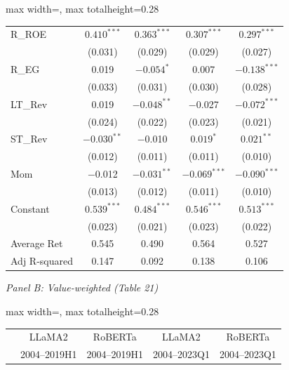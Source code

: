 \begin{table}[htbp]
{\begin{adjustbox}{max width=\linewidth, max totalheight=0.28\textheight}
\begin{tabular}{lcccc}
R\_ROE & $0.410^{***}$ & $0.363^{***}$ & $0.307^{***}$ & $0.297^{***}$ \\
 & \phantom{$-$}(0.031) & \phantom{$-$}(0.029) & \phantom{$-$}(0.029) & \phantom{$-$}(0.027) \\
R\_EG & \phantom{$-$(}0.019\phantom{)} & $-0.054^{*}$ & \phantom{$-$(}0.007\phantom{)} & $-0.138^{***}$ \\
 & \phantom{$-$}(0.033) & \phantom{$-$}(0.031) & \phantom{$-$}(0.030) & \phantom{$-$}(0.028) \\
LT\_Rev & \phantom{$-$(}0.019\phantom{)} & $-0.048^{**}$ & \phantom{(}$-$0.027\phantom{)} & $-0.072^{***}$ \\
 & \phantom{$-$}(0.024) & \phantom{$-$}(0.022) & \phantom{$-$}(0.023) & \phantom{$-$}(0.021) \\
ST\_Rev & $-0.030^{**}$ & \phantom{(}$-$0.010\phantom{)} & $0.019^{*}$ & $0.021^{**}$ \\
 & \phantom{$-$}(0.012) & \phantom{$-$}(0.011) & \phantom{$-$}(0.011) & \phantom{$-$}(0.010) \\
Mom & \phantom{(}$-$0.012\phantom{)} & $-0.031^{**}$ & $-0.069^{***}$ & $-0.090^{***}$ \\
 & \phantom{$-$}(0.013) & \phantom{$-$}(0.012) & \phantom{$-$}(0.011) & \phantom{$-$}(0.010) \\
Constant & $0.539^{***}$ & $0.484^{***}$ & $0.546^{***}$ & $0.513^{***}$ \\
 & \phantom{$-$}(0.023) & \phantom{$-$}(0.021) & \phantom{$-$}(0.023) & \phantom{$-$}(0.022) \\
Average Ret & \phantom{$-$(}0.545\phantom{)} & \phantom{$-$(}0.490\phantom{)} & \phantom{$-$(}0.564\phantom{)} & \phantom{$-$(}0.527\phantom{)} \\
Adj R-squared & \phantom{$-$(}0.147\phantom{)} & \phantom{$-$(}0.092\phantom{)} & \phantom{$-$(}0.138\phantom{)} & \phantom{$-$(}0.106\phantom{)} \\
\bottomrule
\end{tabular}
\end{adjustbox}
\par\medskip
\textit{Panel B: Value-weighted (Table 21)}\\[2pt]
\begin{adjustbox}{max width=\linewidth, max totalheight=0.28\textheight}
\begin{tabular}{lcccc}
\toprule
 & LLaMA2 & RoBERTa & LLaMA2 & RoBERTa \\
 & 2004--2019H1 & 2004--2019H1 & 2004--2023Q1 & 2004--2023Q1 \\

\end{tabular}
\end{adjustbox}}
\end{table}
